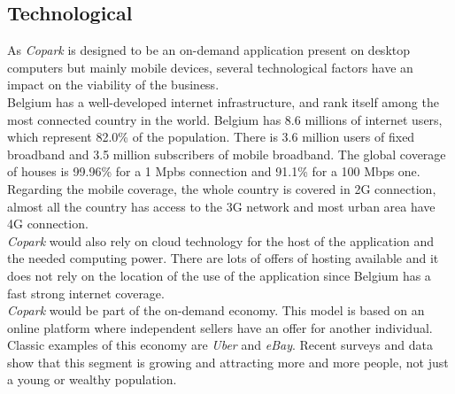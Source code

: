 \documentclass[12pt,a4paper,oneside]{book}
\newcommand{\bp}{\textit{Copark }}
\begin{document}
\subsection{Technological}
As \bp is designed to be an on-demand application present on desktop computers but mainly mobile devices, several technological factors have an impact on the viability of the business.\\

Belgium has a well-developed internet infrastructure, and rank itself among the most connected country in the world. Belgium has 8.6 millions of internet users, which represent 82.0\% of the population.\cite{intuser} There is 3.6 million users of fixed broadband and 3.5 million subscribers of mobile broadband.\cite{intsub} The global coverage of houses is 99.96\% for a 1 Mpbs connection and 91.1\% for a 100 Mbps one.\cite{fixcov} Regarding the mobile coverage, the whole country is covered in 2G connection, almost all the country has access to the 3G network and most urban area have 4G connection.\cite{mobcov}\\

\bp would also rely on cloud technology for the host of the application and the needed computing power. There are lots of offers of hosting available and it does not rely on the location of the use of the application since Belgium has a fast strong internet coverage.\\

\bp would be part of the on-demand economy. This model is based on an online platform where independent sellers have an offer for another individual. Classic examples of this economy are \textit{Uber} and \textit{eBay}. Recent surveys and data show that this segment is growing and attracting more and more people, not just a young or wealthy population.\cite{odegrow}
\end{document}

